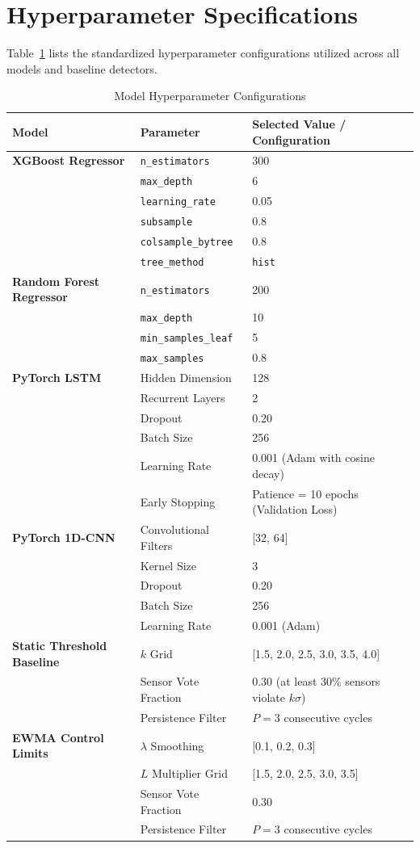 \section{Hyperparameter Specifications}
\label{sec:hyperparameters}

Table~\ref{tab:hyperparameters} lists the standardized hyperparameter configurations utilized across all models and baseline detectors.

\begin{table}[t!]
\centering
\small
\caption{Model Hyperparameter Configurations}
\label{tab:hyperparameters}
\begin{tabular}{llp{9.5cm}}
\toprule
\textbf{Model} & \textbf{Parameter} & \textbf{Selected Value / Configuration} \\
\midrule
\textbf{XGBoost Regressor} & \texttt{n\_estimators} & 300 \\
& \texttt{max\_depth} & 6 \\
& \texttt{learning\_rate} & 0.05 \\
& \texttt{subsample} & 0.8 \\
& \texttt{colsample\_bytree} & 0.8 \\
& \texttt{tree\_method} & \texttt{hist} \\
\midrule
\textbf{Random Forest Regressor} & \texttt{n\_estimators} & 200 \\
& \texttt{max\_depth} & 10 \\
& \texttt{min\_samples\_leaf} & 5 \\
& \texttt{max\_samples} & 0.8 \\
\midrule
\textbf{PyTorch LSTM} & Hidden Dimension & 128 \\
& Recurrent Layers & 2 \\
& Dropout & 0.20 \\
& Batch Size & 256 \\
& Learning Rate & 0.001 (Adam with cosine decay) \\
& Early Stopping & Patience = 10 epochs (Validation Loss) \\
\midrule
\textbf{PyTorch 1D-CNN} & Convolutional Filters & [32, 64] \\
& Kernel Size & 3 \\
& Dropout & 0.20 \\
& Batch Size & 256 \\
& Learning Rate & 0.001 (Adam) \\
\midrule
\textbf{Static Threshold Baseline} & $k$ Grid & [1.5, 2.0, 2.5, 3.0, 3.5, 4.0] \\
& Sensor Vote Fraction & 0.30 (at least 30\% sensors violate $k\sigma$) \\
& Persistence Filter & $P=3$ consecutive cycles \\
\midrule
\textbf{EWMA Control Limits} & $\lambda$ Smoothing & [0.1, 0.2, 0.3] \\
& $L$ Multiplier Grid & [1.5, 2.0, 2.5, 3.0, 3.5] \\
& Sensor Vote Fraction & 0.30 \\
& Persistence Filter & $P=3$ consecutive cycles \\
\bottomrule
\end{tabular}
\end{table}

